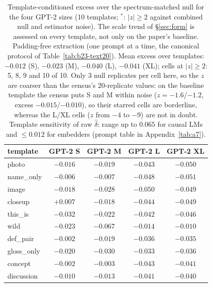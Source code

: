 \begin{table}[H]
\centering
\small
\setlength{\tabcolsep}{4pt}
\begin{tabular}{lcccc}
\toprule
template & GPT-2 S & GPT-2 M & GPT-2 L & GPT-2 XL \\
\midrule
photo & $-0.016$\rlap{$^*$} & $-0.019$\rlap{$^*$} & $-0.043$\rlap{$^*$} & $-0.050$\rlap{$^*$} \\
name\_only & $-0.006$ & $-0.007$ & $-0.048$\rlap{$^*$} & $-0.051$\rlap{$^*$} \\
image & $-0.018$\rlap{$^*$} & $-0.028$\rlap{$^*$} & $-0.050$\rlap{$^*$} & $-0.049$\rlap{$^*$} \\
closeup & $+0.007$ & $-0.018$\rlap{$^*$} & $-0.044$\rlap{$^*$} & $-0.049$\rlap{$^*$} \\
this\_is & $-0.032$\rlap{$^*$} & $-0.022$\rlap{$^*$} & $-0.042$\rlap{$^*$} & $-0.046$\rlap{$^*$} \\
wild & $-0.023$\rlap{$^*$} & $-0.067$\rlap{$^*$} & $-0.014$ & $-0.010$\rlap{$^*$} \\
def\_pair & $-0.002$ & $-0.019$\rlap{$^*$} & $-0.036$\rlap{$^*$} & $-0.035$\rlap{$^*$} \\
gloss\_only & $-0.020$\rlap{$^*$} & $-0.030$\rlap{$^*$} & $-0.033$\rlap{$^*$} & $-0.036$\rlap{$^*$} \\
concept & $-0.002$ & $-0.003$ & $-0.043$\rlap{$^*$} & $-0.041$\rlap{$^*$} \\
discussion & $-0.010$ & $-0.013$\rlap{$^*$} & $-0.041$\rlap{$^*$} & $-0.040$\rlap{$^*$} \\
\bottomrule
\end{tabular}
\caption{Template-conditioned excess over the spectrum-matched null for the four GPT-2 sizes (10 templates; $^*$: $|z|\ge2$ against combined null and estimator noise). The scale trend of \S\ref{sec:form} is assessed on every template, not only on the paper's baseline. Padding-free extraction (one prompt at a time, the canonical protocol of Table~\ref{tab:b23-text20}). Mean excess over templates: $-0.012$ (S), $-0.023$ (M), $-0.040$ (L), $-0.041$ (XL); cells at $|z|\ge2$: 5, 8, 9 and 10 of 10. Only 3 null replicates per cell here, so the $z$ are coarser than the census's 20-replicate values: on the baseline template the census puts S and M within noise ($z=-1.6$/$-1.2$, excess $-0.015$/$-0.010$), so their starred cells are borderline, whereas the L/XL cells ($z$ from $-4$ to $-9$) are not in doubt. Template sensitivity of raw $\hat\delta$: range up to $0.065$ for causal LMs and $\le0.012$ for embedders (prompt table in Appendix~\ref{tab:a7}).}
\label{tab:b14-templates}
\end{table}
